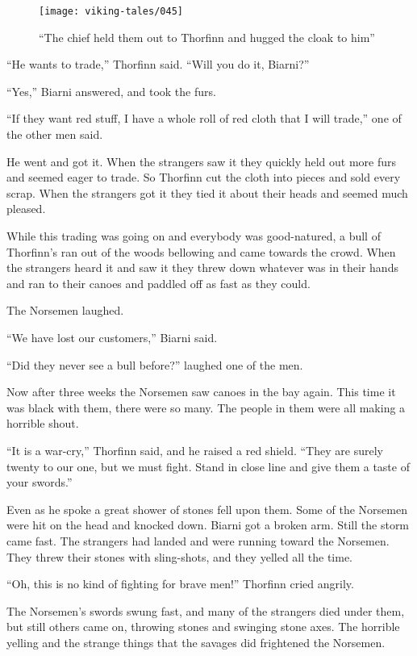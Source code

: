 \begin{figure}[ht]
    \centering
    \texttt{[image: viking-tales/045]}
    \caption{``The chief held them out to Thorfinn and hugged the cloak
        to him''}
\end{figure}

``He wants to trade,'' Thorfinn said. ``Will you do it, Biarni?''

``Yes,'' Biarni answered, and took the furs.

``If they want red stuff, I have a whole roll of red cloth that I will
trade,'' one of the other men said.

He went and got it. When the strangers saw it they quickly held out more
furs and seemed eager to trade. So Thorfinn cut the cloth into pieces
and sold every scrap. When the strangers got it they tied it about their
heads and seemed much pleased.

While this trading was going on and everybody was good-natured, a bull
of Thorfinn's ran out of the woods bellowing and came towards the crowd.
When the strangers heard it and saw it they threw down whatever was in
their hands and ran to their canoes and paddled off as fast as they
could.

The Norsemen laughed.

``We have lost our customers,'' Biarni said.

``Did they never see a bull before?'' laughed one of the men.

Now after three weeks the Norsemen saw canoes in the bay again. This
time it was black with them, there were so many. The people in them were
all making a horrible shout.

``It is a war-cry,'' Thorfinn said, and he raised a red shield. ``They
are surely twenty to our one, but we must fight. Stand in close line and
give them a taste of your swords.''

Even as he spoke a great shower of stones fell upon them. Some of the
Norsemen were hit on the head and knocked down. Biarni got a broken arm.
Still the storm came fast. The strangers had landed and were running
toward the Norsemen. They threw their stones with sling-shots, and they
yelled all the time.

``Oh, this is no kind of fighting for brave men!'' Thorfinn cried
angrily.

The Norsemen's swords swung fast, and many of the strangers died under
them, but still others came on, throwing stones and swinging stone axes.
The horrible yelling and the strange things that the savages did
frightened the Norsemen.

